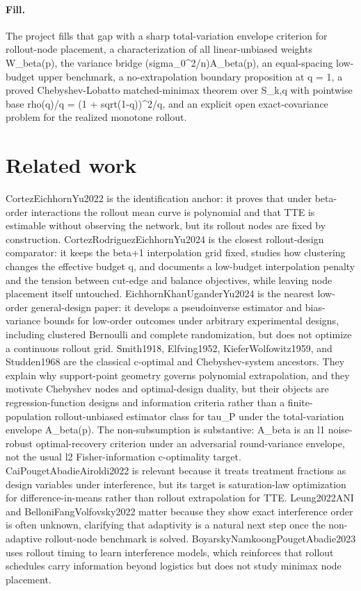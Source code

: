 \documentclass{article}
\begin{document}
\paragraph{Fill.} The project fills that gap with a sharp total-variation envelope criterion for rollout-node placement, a characterization of all linear-unbiased weights W_beta(p), the variance bridge (sigma_0^2/n)A_beta(p), an equal-spacing low-budget upper benchmark, a no-extrapolation boundary proposition at q = 1, a proved Chebyshev-Lobatto matched-minimax theorem over S_{k,q} with pointwise base rho(q)/q = (1 + sqrt(1-q))^2/q, and an explicit open exact-covariance problem for the realized monotone rollout.

\section{Related work}

CortezEichhornYu2022 is the identification anchor: it proves that under beta-order interactions the rollout mean curve is polynomial and that TTE is estimable without observing the network, but its rollout nodes are fixed by construction. CortezRodriguezEichhornYu2024 is the closest rollout-design comparator: it keeps the beta+1 interpolation grid fixed, studies how clustering changes the effective budget q, and documents a low-budget interpolation penalty and the tension between cut-edge and balance objectives, while leaving node placement itself untouched. EichhornKhanUganderYu2024 is the nearest low-order general-design paper: it develops a pseudoinverse estimator and bias-variance bounds for low-order outcomes under arbitrary experimental designs, including clustered Bernoulli and complete randomization, but does not optimize a continuous rollout grid.
Smith1918, Elfving1952, KieferWolfowitz1959, and Studden1968 are the classical c-optimal and Chebyshev-system ancestors. They explain why support-point geometry governs polynomial extrapolation, and they motivate Chebyshev nodes and optimal-design duality, but their objects are regression-function designs and information criteria rather than a finite-population rollout-unbiased estimator class for tau_P under the total-variation envelope A_beta(p). The non-subsumption is substantive: A_beta is an l1 noise-robust optimal-recovery criterion under an adversarial round-variance envelope, not the usual l2 Fisher-information c-optimality target.
CaiPougetAbadieAiroldi2022 is relevant because it treats treatment fractions as design variables under interference, but its target is saturation-law optimization for difference-in-means rather than rollout extrapolation for TTE. Leung2022ANI and BelloniFangVolfovsky2022 matter because they show exact interference order is often unknown, clarifying that adaptivity is a natural next step once the non-adaptive rollout-node benchmark is solved. BoyarskyNamkoongPougetAbadie2023 uses rollout timing to learn interference models, which reinforces that rollout schedules carry information beyond logistics but does not study minimax node placement. 
\end{document}
